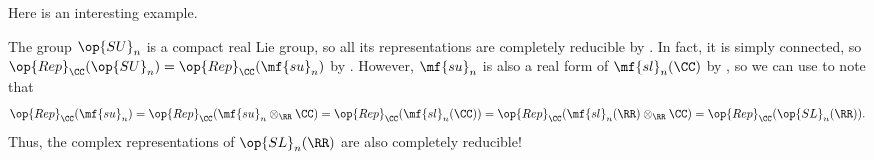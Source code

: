 \documentclass[../notes.tex]{subfiles}
\begin{document}
Here is an interesting example.
\begin{example}
	The group $\op{SU}_n$ is a compact real Lie group, so all its representations are completely reducible by . In fact, it is simply connected, so $\op{Rep}_\CC({\op{SU}_n})=\op{Rep}_\CC(\mf{su}_n)$ by . However, $\mf{su}_n$ is also a real form of $\mf{sl}_n(\CC)$ by , so we can use  to note that
	\[\op{Rep}_\CC(\mf{su}_n)=\op{Rep}_\CC(\mf{su}_n\otimes_\RR\CC)=\op{Rep}_\CC(\mf{sl}_n(\CC))=\op{Rep}_\CC(\mf{sl}_n(\RR)\otimes_\RR\CC)=\op{Rep}_\CC({\op{SL}_n(\RR)}).\]
	Thus, the complex representations of $\op{SL}_n(\RR)$ are also completely reducible!
\end{example}
\end{document}
